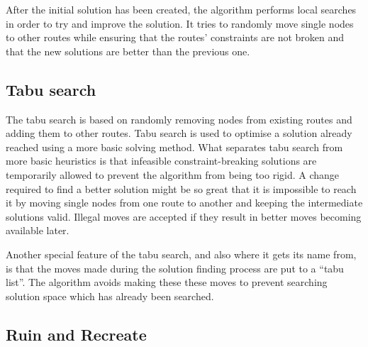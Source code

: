 After the initial solution has been created, the algorithm performs local searches in order to try and improve the solution. It tries to randomly move single nodes to other routes while ensuring that the routes' constraints are not broken and that the new solutions are better than the previous one. \cite{kontoravdis1995grasp}


\subsection{Tabu search}

The tabu search is based on randomly removing nodes from existing routes and adding them to other routes. Tabu search is used to optimise a solution already reached using a more basic solving method. What separates tabu search from more basic heuristics is that infeasible constraint-breaking solutions are temporarily allowed to prevent the algorithm from being too rigid. A change required to find a better solution might be so great that it is impossible to reach it by moving single nodes from one route to another and keeping the intermediate solutions valid. Illegal moves are accepted if they result in better moves becoming available later. \cite{gendreau1994tabu}

Another special feature of the tabu search, and also where it gets its name from, is that the moves made during the solution finding process are put to a ``tabu list''. The algorithm avoids making these these moves to prevent searching solution space which has already been searched. \cite{gendreau1994tabu}
 

\subsection {Ruin and Recreate}
\label{subsection:ruinandrecreate} 

